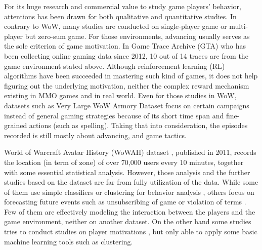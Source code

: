 \documentclass{sigchi}
\begin{document}
For its huge research and commercial value to study game players' behavior, attentions has been drawn for both qualitative and quantitative studies.
In contrary to WoW, many studies are conducted on single-player game or multi-player but zero-sum game. 
For those environments, advancing usually serves as the sole criterion of game motivation.
In Game Trace Archive (GTA) \cite{guo2012game} who has been collecting online gaming data since 2012, 10 out of 14 traces are from the game environment stated above.
Although reinforcement learning (RL) algorithms have been succeeded in mastering such kind of games, it does not help figuring out the underlying motivation, neither the complex reward mechanism existing in MMO games and in real world. 
Even for those studies in WoW, datasets such as Very Large WoW Armory Dataset \cite{Bell2013a} focus on certain campaigns instead of general gaming strategies because of its short time span and fine-grained actions (such as spelling).
Taking that into consideration, the episodes recorded is still mostly about advancing, and game tactics.

World of Warcraft Avatar History (WoWAH) dataset \cite{lee2011world}, published in 2011, records the location (in term of zone) of over 70,000 users every 10 minutes, together with some essential statistical analysis. 
However, those analysis and the further studies based on the dataset are far from fully utilization of the data. 
While some of them use simple classifiers or clustering for behavior analysis \cite{suznjevic2011mmorpg,drachen2014comparison}, others focus on forecasting future events such as unsubscribing of game or violation of terms \cite{bauckhage2015clustering,thawonmas2011analysis,lou2012forecasting}. 
Few of them are effectively modeling the interaction between the players and the game environment, neither on another dataset. 
On the other hand some studies tries to conduct studies on player motivations \cite{Bell2013a}, but only able to apply some basic machine learning tools such as clustering.  
\end{document}
